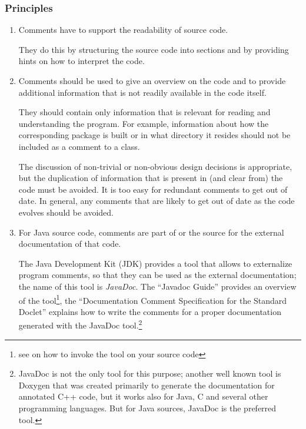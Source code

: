 \documentclass[11pt,a4paper, titlepage, parskip=half, headsepline, footsepline, cleardoublepage=current, headheight=1cm]{scrbook}
\begin{document}
\subsubsection{Principles}
\begin{enumerate}[label=P\arabic*.]
\item{Comments have to support the readability of source code.

They do this by structuring the source code into sections and by providing hints on how to interpret the code.}

\item{Comments should be used to give an overview on the code and to provide additional information that is not readily available in the code itself.

They should contain only information that is relevant for reading and understanding the program. For example, information about how the corresponding package is built or in what directory it resides should not be included as a comment to a class.

The discussion of non-trivial or non-obvious design decisions is appropriate, but the duplication of information that is present in (and clear from) the code must be avoided. It is too easy for redundant comments to get out of date. In general, any comments that are likely to get out of date as the code evolves should be avoided.}

\item{For Java source code, comments are part of or the source for the external documentation of that code.

The Java Development Kit (JDK) provides a tool that allows to externalize program comments, so that they can be used as the external documentation; the name of this tool is \textit{JavaDoc}. The “Javadoc Guide”\autocite{ORACLE_DOC_JAVADOC_GUIDE} provides an overview of the tool\footnote{see \autocite{ORACLE_DOC_JAVADOC_MAN} on how to invoke the tool on your source code}, the “Documentation Comment Specification for the Standard Doclet”\autocite{ORACLE_DOC_JAVADOC_TAG} explains how to write the comments for a proper documentation generated with the JavaDoc tool.\footnote{JavaDoc is not the only tool for this purpose; another well known tool is Doxygen\autocite{DOXYGEN_HOMEPAGE} that was created primarily to generate the documentation for annotated C++ code, but it works also for Java, C and several other programming languages. But for Java sources, JavaDoc is the preferred tool.}}


\end{enumerate}
\end{document}
